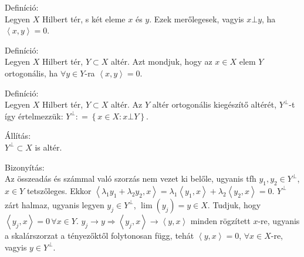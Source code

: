 \documentclass[12pt,a4paper]{scrartcl}
\newenvironment{definicio}{}{}
\newenvironment{bizonyitas}{}{}
\newenvironment{allitas}{}{}
\begin{document}
\begin{definicio}

Definíció:\\
Legyen \(X\) Hilbert tér, s két eleme \(x\) és \(y\). Ezek merőlegesek,
vagyis \(x\bot y\), ha \(\left\langle {x,y} \right\rangle = 0\).

\end{definicio}

\begin{definicio}

Definíció:\\
Legyen \(X\) Hilbert tér, \(Y \subset X\) altér. Azt mondjuk, hogy az
\(x \in X\) elem \(Y\) ortogonális, ha \(\forall y \in Y\)-ra
\(\left\langle {x,y} \right\rangle = 0\).

\end{definicio}

\begin{definicio}

Definíció:\\
Legyen \(X\) Hilbert tér, \(Y \subset X\) altér. Az \(Y\) altér
ortogonális kiegészítő altérét, \(Y^{\bot}\)-t így értelmezzük:
\(Y^{\bot}: = \left\{ {x \in X:x\bot Y} \right\}\).

\end{definicio}

\begin{allitas}

Állítás:\\
\(Y^{\bot} \subset X\) is altér.

\end{allitas}

\begin{bizonyitas}

Bizonyítás:\\
Az összeadás és számmal való szorzás nem vezet ki belőle, ugyanis tfh
\(y_{1},y_{2} \in Y^{\bot}\), \(x \in Y\) tetszőleges. Ekkor
\(\left\langle {\lambda_{1}y_{1} + \lambda_{2}y_{2},x} \right\rangle = \lambda_{1}\left\langle {y_{1},x} \right\rangle + \lambda_{2}\left\langle {y_{2},x} \right\rangle = 0\).
\(Y^{\bot}\) zárt halmaz, ugyanis legyen \(y_{j} \in Y^{\bot}\),
\(\lim\left( y_{j} \right) = y \in X\). Tudjuk, hogy
\(\left\langle {y_{j},x} \right\rangle = 0\,\forall x \in Y\).
\(\left. y_{j}\rightarrow y\Rightarrow\left\langle {y_{j},x} \right\rangle\rightarrow\left\langle {y,x} \right\rangle \right.\)
minden rögzített \(x\)-re, ugyanis a skalárszorzat a tényezőktől
folytonosan függ, tehát \(\left\langle {y,x} \right\rangle = 0\),
\(\forall x \in X\)-re, vagyis \(y \in Y^{\bot}\).

\end{bizonyitas}
\end{document}
